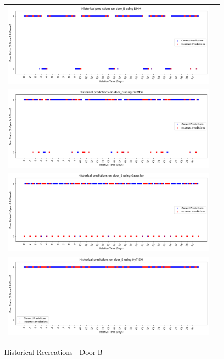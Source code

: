 \begin{center}
\begin{figure}[!Hp]
  \begin{tabular}{cc}
    {\includegraphics[width = 6in]{images/results/Historical_door_B_DMM.png}} \\
    {\includegraphics[width = 6in]{images/results/Historical_door_B_FreMEn.png}} \\
    {\includegraphics[width = 6in]{images/results/Historical_door_B_Gaussian.png}} \\
    {\includegraphics[width = 6in]{images/results/Historical_door_B_HyT-EM.png}} \\
  \end{tabular}
  \caption{Historical Recreations - Door B}
\end{figure}\\ \\


\end{center}
